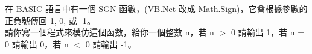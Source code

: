 在 BASIC 語言中有一個 SGN 函數，(VB.Net 改成 Math.Sign)，它會根據參數的正負號傳回 1, 0, 或 -1。\\
請你寫一個程式來模仿這個函數，給你一個整數 n，若 n $>$ 0 請輸出 1，若 n = 0 請輸出 0，若 n $<$ 0 請輸出 -1。\\
